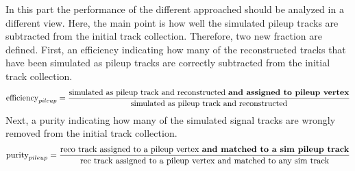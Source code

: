 In this part the performance of the different approached should be analyzed in a different view. Here, the main point is how well the simulated pileup tracks are subtracted from the initial track collection. Therefore, two new fraction are defined. First, an efficiency indicating how many of the reconstructed tracks that have been simulated as pileup tracks are correctly subtracted from the initial track collection. 
\begin{equation}
\textrm{efficiency}_{pileup} = \frac{\textrm{simulated as pileup track and reconstructed \textbf{and assigned to pileup vertex}}}{\textrm{simulated as pileup track and reconstructed}}
\label{eq:PUEfficiency}
\end{equation}
Next, a purity indicating how many of the simulated signal tracks are wrongly removed from the initial track collection.
\begin{equation}
\textrm{purity}_{pileup} = \frac{\textrm{reco track assigned to a pileup vertex \textbf{and matched to a sim pileup track}}}{\textrm{rec track assigned to a pileup vertex and matched to any sim track}}
\label{eq:PUPurity}
\end{equation}

